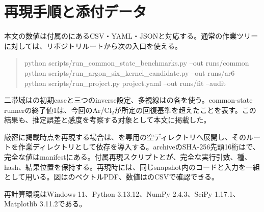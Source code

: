 \section{再現手順と添付データ}
\small
本文の数値は付属のにあるCSV・YAML・JSONと対応する。通常の作業ツリーに対しては、リポジトリルートから次の入口を使える。
\begin{quote}\small\ttfamily
python scripts/run\_common\_state\_benchmarks.py --out runs/common\\
python scripts/run\_argon\_six\_kernel\_candidate.py --out runs/ar6\\
python scripts/run\_project.py project.yaml --out runs/fit --audit
\end{quote}
二帯域はの初期caseと三つのinverse設定、多視線はの各を使う。common-state runnerの終了値1は、今回のAr/Cl$_2$が所定の回復基準を超えたことを表す。この結果も、推定誤差と感度を考察する対象として本文に掲載した。

厳密に掲載時点を再現する場合は、を専用の空ディレクトリへ展開し、そのルートを作業ディレクトリとして依存を導入する。archiveのSHA-256先頭16桁はで、完全な値はmanifestにある。付属再現スクリプトとが、完全な実行引数、種、hash、結果位置を保持する。再現時には、同じsnapshot内のコードと入力を一組として用いる。図はのベクトルPDF、数値はのCSVで確認できる。

再計算環境はWindows 11、Python 3.13.12、NumPy 2.4.3、SciPy 1.17.1、Matplotlib 3.11.2である。
\normalsize

